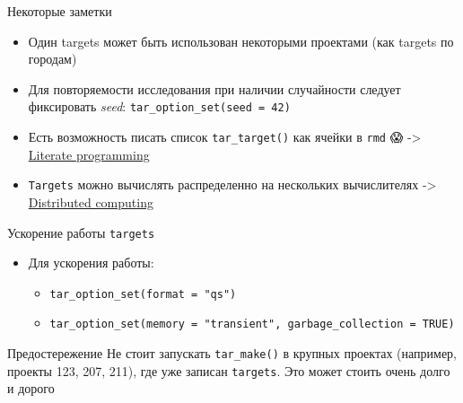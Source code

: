 \documentclass[
  ignorenonframetext,
]{beamer}
\begin{document}
\begin{frame}[fragile]{Некоторые заметки}
\label{ux43dux435ux43aux43eux442ux43eux440ux44bux435-ux437ux430ux43cux435ux442ux43aux438}
\begin{itemize}
\item
  Один targets может быть использован некоторыми проектами (как targets
  по городам)
\item
  Для повторяемости исследования при наличии случайности следует
  фиксировать \emph{seed}: \texttt{tar\_option\_set(seed\ =\ 42)}
\item
  Есть возможность писать список \texttt{tar\_target()} как ячейки в
  \texttt{rmd} 😱 -\textgreater{}
  \href{https://books.ropensci.org/targets/literate-programming.html}{Literate
  programming}
\item
  \texttt{Targets} можно вычислять распределенно на нескольких
  вычислителях -\textgreater{}
  \href{https://books.ropensci.org/targets/crew.html}{Distributed
  computing}
\end{itemize}
\end{frame}

\begin{frame}[fragile]{Ускорение работы \texttt{targets}}
\label{ux443ux441ux43aux43eux440ux435ux43dux438ux435-ux440ux430ux431ux43eux442ux44b-targets}
\begin{itemize}
\item
  Для ускорения работы:

  \begin{itemize}
  \item
    \texttt{tar\_option\_set(format\ =\ "qs")}
  \item
    \texttt{tar\_option\_set(memory\ =\ "transient",\ garbage\_collection\ =\ TRUE)}
  \end{itemize}
\end{itemize}
\end{frame}

\begin{frame}[fragile]{Предостережение}
\label{ux43fux440ux435ux434ux43eux441ux442ux435ux440ux435ux436ux435ux43dux438ux435}
Не стоит запускать \texttt{tar\_make()} в крупных проектах (например,
проекты 123, 207, 211), где уже записан \texttt{targets}. Это может
стоить очень долго и дорого
\end{frame}
\end{document}
